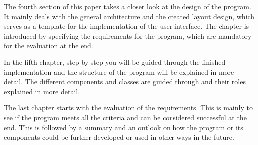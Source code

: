 The fourth section of this paper takes a closer look at the design of the program. It mainly deals with the general architecture and the created layout design, which serves as a template for the implementation of the user interface. The chapter is introduced by specifying the requirements for the program, which are mandatory for the evaluation at the end.

In the fifth chapter, step by step you will be guided through the finished implementation and the structure of the program will be explained in more detail. The different components and classes are guided through and their roles explained in more detail.

The last chapter starts with the evaluation of the requirements. This is mainly to see if the program meets all the criteria and can be considered successful at the end. This is followed by a summary and an outlook on how the program or its components could be further developed or used in other ways in the future.